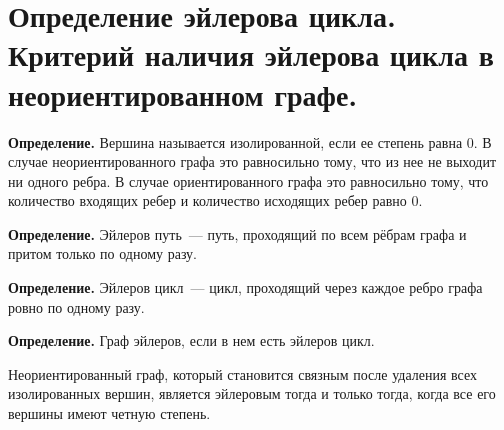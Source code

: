 \setcounter{section}{39}
\section{Определение эйлерова цикла. Критерий наличия эйлерова цикла в неориентированном графе.}

\textbf{Определение.} Вершина называется изолированной, если ее степень равна $0$. В случае неориентированного графа это равносильно тому, что из нее не выходит ни одного ребра. В случае ориентированного графа это равносильно тому, что количество входящих ребер и количество исходящих ребер равно 0.

\textbf{Определение.} Эйлеров путь~--- путь, проходящий по всем рёбрам графа и притом только по одному разу.

\textbf{Определение.} Эйлеров цикл~--- цикл, проходящий через каждое ребро графа ровно по одному разу.

\textbf{Определение.} Граф эйлеров, если в нем есть эйлеров цикл.
 
\begin{theorem}
Неориентированный граф, который становится связным после удаления всех изолированных вершин, является эйлеровым  тогда и только тогда, когда все его вершины имеют четную степень.
\end{theorem}

